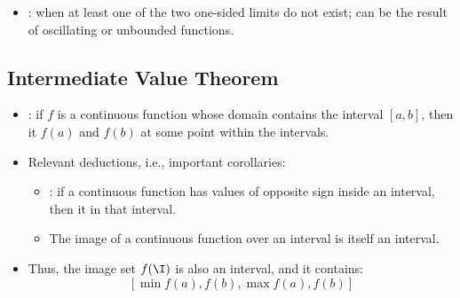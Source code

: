 \begin{itemize}
\begin{itemize}
\begin{itemize}
      \item {}: when at least one of the two one-sided limits do
        not exist; can be the result of oscillating or unbounded functions.

    \end{itemize}

  \end{itemize}

  \subsection{Intermediate Value Theorem}
  \begin{itemize}
    \item {}: if \( f \) is a continuous function
      whose domain contains the interval \( \left[ a, b \right] \), then it
       \( f(a) \) and \( f(b) \) at some
      point within the intervals.
    \item Relevant deductions, i.e., important corollaries:
      \begin{itemize}
        \item {}: if a continuous function has values of
          opposite sign inside an interval, then it  in that
          interval.
        \item The image of a continuous function over an interval is itself an
          interval.
      \end{itemize}

    \item Thus, the image set \( f(\I) \)  is also an
      interval, and it contains:
      \[
        \left[ \min{f(a),f(b)}, \max{f(a),f(b)} \right]
      \]
  \end{itemize}

\end{itemize}

